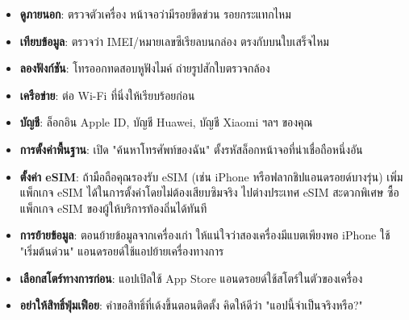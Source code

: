 

\begin{itemize}
  \item \textbf{ดูภายนอก}: ตรวจตัวเครื่อง หน้าจอว่ามีรอยขีดข่วน รอยกระแทกไหม
  \item \textbf{เทียบข้อมูล}: ตรวจว่า IMEI/หมายเลขซีเรียลบนกล่อง ตรงกับบนใบเสร็จไหม
  \item \textbf{ลองฟังก์ชัน}: โทรออกทดสอบหูฟังไมค์ ถ่ายรูปสักใบตรวจกล้อง
\end{itemize}


\begin{itemize}
  \item \textbf{เครือข่าย}: ต่อ Wi-Fi ที่นิ่งให้เรียบร้อยก่อน
  \item \textbf{บัญชี}: ล็อกอิน Apple ID, บัญชี Huawei, บัญชี Xiaomi ฯลฯ ของคุณ
  \item \textbf{การตั้งค่าพื้นฐาน}: เปิด "ค้นหาโทรศัพท์ของฉัน" ตั้งรหัสล็อกหน้าจอที่น่าเชื่อถือหนึ่งอัน
  \item \textbf{ตั้งค่า eSIM}: ถ้ามือถือคุณรองรับ eSIM (เช่น iPhone หรือฟลากชิปแอนดรอยด์บางรุ่น) เพิ่มแพ็กเกจ eSIM ได้ในการตั้งค่าโดยไม่ต้องเสียบซิมจริง ไปต่างประเทศ eSIM สะดวกพิเศษ ซื้อแพ็กเกจ eSIM ของผู้ให้บริการท้องถิ่นได้ทันที
  \item \textbf{การย้ายข้อมูล}: ตอนย้ายข้อมูลจากเครื่องเก่า ให้แน่ใจว่าสองเครื่องมีแบตเพียงพอ iPhone ใช้ "เริ่มต้นด่วน" แอนดรอยด์ใช้แอปย้ายเครื่องทางการ
\end{itemize}


\begin{itemize}
  \item \textbf{เลือกสโตร์ทางการก่อน}: แอปเปิลใช้ App Store แอนดรอยด์ใช้สโตร์ในตัวของเครื่อง
  \item \textbf{อย่าให้สิทธิ์ฟุ่มเฟือย}: คำขอสิทธิ์ที่เด้งขึ้นตอนติดตั้ง คิดให้ดีว่า "แอปนี้จำเป็นจริงหรือ?"
\end{itemize}
